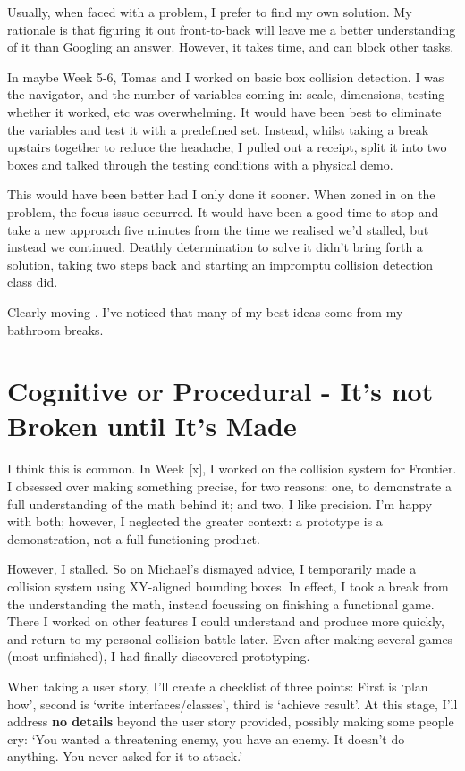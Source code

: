 \documentclass{scrartcl}
\begin{document}
Usually, when faced with a problem, I prefer to find my own solution. My rationale is that figuring it out front-to-back will leave me a better understanding of it than Googling an answer. However, it takes time, and can block other tasks.

In maybe Week 5-6, Tomas and I worked on basic box collision detection. I was the navigator, and the number of variables coming in: scale, dimensions, testing whether it worked, etc was overwhelming. It would have been best to eliminate the variables and test it with a predefined set. Instead, whilst taking a break upstairs together to reduce the headache, I pulled out a receipt, split it into two boxes and talked  through the testing conditions with a physical demo.

This would have been better had I only done it sooner. When zoned in on the problem, the focus issue occurred. It would have been a good time to stop and take a new approach five minutes from the time we realised we'd stalled, but instead we continued. Deathly determination to solve it didn't bring forth a solution, taking two steps back and starting an impromptu collision detection class did.

Clearly moving . I've noticed that many of my best ideas come from my bathroom breaks. 

\section{Cognitive or Procedural - It's not Broken until It's Made}

I think this is common. In Week [x], I worked on the collision system for Frontier. I obsessed over making something precise, for two reasons: one, to demonstrate a full understanding of the math behind it; and two, I like precision. I'm happy with both; however, I neglected the greater context: a prototype is a demonstration, not a full-functioning product.

However, I stalled. So on Michael's dismayed advice, I temporarily made a collision system using XY-aligned bounding boxes. In effect, I took a break from the understanding the math, instead focussing on finishing a functional game. There I worked on other features I could understand and produce more quickly, and return to my personal collision battle later. Even after making several games (most unfinished), I had finally discovered prototyping.

When taking a user story, I'll create a checklist of three points: First is `plan how', second is `write interfaces/classes', third is `achieve result'. At this stage, I'll address \textbf{no details} beyond the user story provided, possibly making some people cry: `You wanted a threatening enemy, you have an enemy. It doesn't do anything. You never asked for it to attack.'
\end{document}
